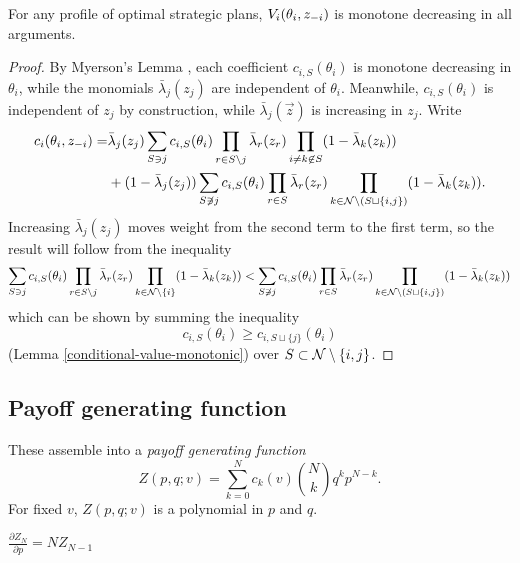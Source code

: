 \begin{lemma}

  For any profile of optimal strategic plans, $V_i(\theta_i,z_{-i})$ is monotone decreasing in all arguments.

\end{lemma}
%
\begin{proof}

  By Myerson's Lemma \cite[Thm.~3.3]{milgrom2004putting}, each coefficient $c_{i,S}(\theta_i)$ is monotone decreasing in $\theta_i$, while the monomials $\bar\lambda_j(z_j)$ are independent of $\theta_i$.
  Meanwhile, $c_{i,S}(\theta_i)$ is independent of $z_j$ by construction, while $\bar\lambda_j(\vec{z})$ is increasing in $z_j$.
  Write
  \begin{align*}
    c_i(\theta_i,z_{-i}) =& \bar\lambda_j(z_j) \sum_{S\ni j} c_{i,S}(\theta_i) \prod_{r\in S\setminus j}\bar\lambda_r(z_r) \prod_{i\neq k\not\in S} (1-\bar\lambda_k(z_k)) \\ 
    &+ (1-\bar\lambda_j(z_j))\sum_{S\not\ni j} c_{i,S}(\theta_i) \prod_{r\in S}\bar\lambda_r(z_r) \prod_{k\in\mathcal{N}\setminus(S\sqcup\{i,j\})} (1-\bar\lambda_k(z_k)).
  \end{align*}
  Increasing $\bar\lambda_j(z_j)$ moves weight from the second term to the first term, so the result will follow from the inequality
  \[
    \sum_{S\ni j} c_{i,S}(\theta_i) \prod_{r\in S\setminus j}\bar\lambda_r(z_r) \prod_{k\in\mathcal{N}\setminus\{i\}} (1-\bar\lambda_k(z_k)) \\ 
    <\sum_{S\not\ni j} c_{i,S}(\theta_i) \prod_{r\in S}\bar\lambda_r(z_r) \prod_{k\in\mathcal{N}\setminus(S\sqcup\{i,j\})} (1-\bar\lambda_k(z_k))
  \]
  which can be shown by summing the inequality
  \[
    c_{i,S}(\theta_i) \geq c_{i,S\sqcup\{j\}}(\theta_i)
  \]
  (Lemma \ref{conditional-value-monotonic}) over $S\subset \mathcal{N}\setminus\{i,j\}$. \qedhere

\end{proof}



\subsection{Payoff generating function}


These assemble into a \emph{payoff generating function}
\[
  Z(p,q;v) = \sum_{k=0}^N c_{k}(v){N\choose k} q^kp^{N-k}.
\]
For fixed $v$, $Z(p,q;v)$ is a polynomial in $p$ and $q$.

\begin{lemma} $\frac{\partial Z_N}{\partial p} = NZ_{N-1}$ \end{lemma}

